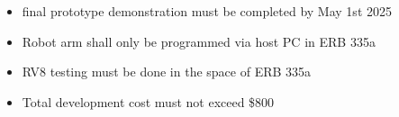 \begin{itemize}
    \item final prototype demonstration must be completed by May 1st 2025
    \item Robot arm shall only be programmed via host PC in ERB 335a
    \item RV8 testing must be done in the space of ERB 335a
    \item Total development cost must not exceed \$800
\end{itemize}